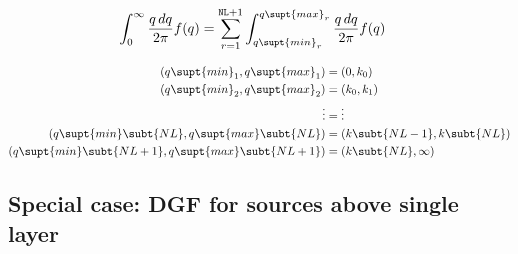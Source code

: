 \documentclass[letterpaper]{article}
\begin{document}
\begin{align*}
 \int_0^\infty \frac{q\,dq}{2\pi} f(q)
&=\sum_{r=1}^{\texttt{NL}+1}
  \int_{q\supt{min}_r}^{q\supt{max}_r} \frac{q\,dq}{2\pi} f(q)
\end{align*}

\begin{align*} 
 ( q\supt{min}_1, q\supt{max}_1) &= (0,   k_0) 
\\ 
 ( q\supt{min}_2, q\supt{max}_2) &= (k_0, k_1) 
\\
  \vdots &= \vdots
\\
 ( q\supt{min}\subt{NL}, q\supt{max}\subt{NL}) 
                                 &= (k\subt{NL-1}, k\subt{NL}) 
\\
 ( q\supt{min}\subt{NL+1}, q\supt{max}\subt{NL+1})
                                 &= (k\subt{NL}, \infty)
\end{align*} 

\subsection*{Special case: DGF for sources above single layer}
\end{document}
